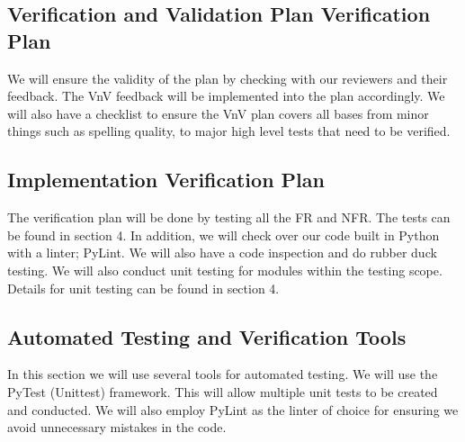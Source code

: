\documentclass[12pt, titlepage]{article}
\begin{document}


\subsection{Verification and Validation Plan Verification Plan}

We will ensure the validity of the plan by checking with our reviewers and
their feedback. The VnV feedback will be implemented into the plan accordingly.
We will also have a checklist to ensure the VnV plan covers all bases from minor 
things such as spelling quality, to major high level tests that need to be verified.



\subsection{Implementation Verification Plan}

The verification plan will be done by testing all the FR and
NFR. The tests can be found in section 4. In addition, we will check over our code built
in Python with a linter; PyLint. We will also have a code inspection and do rubber duck
testing. We will also conduct unit testing for modules 
within the testing scope. Details for unit testing can be found in section 4.



\subsection{Automated Testing and Verification Tools}
In this section we will use several tools for automated testing. We will use the PyTest
 (Unittest) framework. This will allow multiple unit tests to be created and conducted.
 We will also employ PyLint as the linter of choice for ensuring we avoid unnecessary
 mistakes in the code. 
\end{document}
